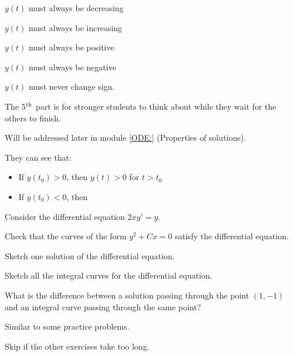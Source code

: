 \begin{parts}
	\item $y(t)$ must always be decreasing
	\item $y(t)$ must always be increasing \\[5pt]

	\item $y(t)$ must always be positive
	\item $y(t)$ must always be negative \\[5pt]
	
	\item $y(t)$ must never change sign.
\end{parts}
\begin{annotation}
\begin{goals}
	The 5$^{\rm th}$ part is for stronger students to think about while they wait for the others to finish.
	
	Will be addressed later in module \ref{ODE:} (Properties of solutions).
	
	They can see that:
	\begin{itemize}
		\item If $y(t_0)>0$, then $y(t)>0$ for $t>t_0$
		\item If $y(t_0)<0$, then

	\end{itemize}
\end{goals}
\end{annotation}




\bookonlynewpage

\question Consider the differential equation $2xy'=y$.
	
	\begin{parts}
		\item Check that the curves of the form $y^2 + C x = 0$ satisfy the differential equation.
		\item Sketch one solution of the differential equation.
		\item Sketch all the integral curves for the differential equation.
		\item What is the difference between a solution passing through the point $(1,-1)$ and an integral curve passing through the same point?
	\end{parts}
\begin{annotation}
\begin{goals}
	Similar to some practice problems.
	
	Skip if the other exercises take too long.
\end{goals}
\end{annotation}







